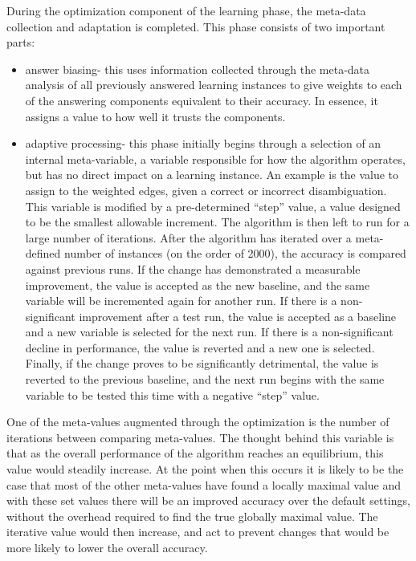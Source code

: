 During the optimization component of the learning phase, the meta-data collection and adaptation is completed.  This phase consists of two important parts:
\begin{itemize}
	\item answer biasing- this uses information collected through the meta-data analysis of all previously answered learning instances to give weights to each of the answering components equivalent to their accuracy. In essence, it assigns a value to how well it trusts the components.
	\item adaptive processing- this phase initially begins through a selection of an internal meta-variable, a variable responsible for how the algorithm operates, but has no direct impact on a learning instance. An example is the value to assign to the weighted edges, given a correct or incorrect disambiguation. This variable is modified by a pre-determined ``step'' value, a value designed to be the smallest allowable increment.  The algorithm is then left to run for a large number of iterations.  After the algorithm has iterated over a meta-defined number of instances (on the order of 2000), the accuracy is compared against previous runs.  If the change has demonstrated a measurable improvement, the value is accepted as the new baseline, and the same variable will be incremented again for another run.  If there is a non-significant improvement after a test run, the value is accepted as a baseline and a new variable is selected for the next run. If there is a non-significant decline in performance, the value is reverted and a new one is selected.  Finally, if the change proves to be significantly detrimental, the value is reverted to the previous baseline, and the next run begins with the same variable to be tested this time with a negative ``step'' value. 
\end{itemize}

One of the meta-values augmented through the optimization is the number of iterations between comparing meta-values.  The thought behind this variable is that as the overall performance of the algorithm reaches an equilibrium, this value would steadily increase.  At the point when this occurs it is likely to be the case that most of the other meta-values have found a locally maximal value and with these set values there will be an improved accuracy over the default settings, without the overhead required to find the true globally maximal value. The iterative value would then increase, and act to prevent changes that would be more likely to lower the overall accuracy.

